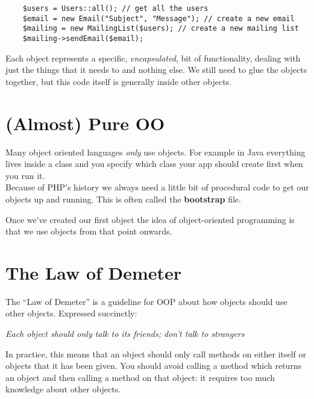 \begin{verbatim}
    $users = Users::all(); // get all the users
    $email = new Email("Subject", "Message"); // create a new email
    $mailing = new MailingList($users); // create a new mailing list
    $mailing->sendEmail($email);
\end{verbatim}

Each object represents a specific, \textit{encapsulated}, bit of functionality, dealing with just the things that it needs to and nothing else. We still need to glue the objects together, but this code itself is generally inside other objects.



\section{(Almost) Pure OO}

Many object oriented languages \textit{only} use objects. For example in Java everything lives inside a class and you specify which class your app should create first when you run it.
\\

Because of PHP's history we always need a little bit of procedural code to get our objects up and running. This is often called the \textbf{bootstrap} file.


Once we've created our first object the idea of object-oriented programming is that we use objects from that point onwards.


\section{The Law of Demeter}

The ``Law of Demeter'' is a guideline for OOP about how objects should use other objects. Expressed succinctly:

\begin{center}
    \textit{Each object should only talk to its friends; don't talk to strangers}
\end{center}

In practice, this means that an object should only call methods on either itself or objects that it has been given. You should avoid calling a method which returns an object and then calling a method on that object: it requires too much knowledge about other objects.



